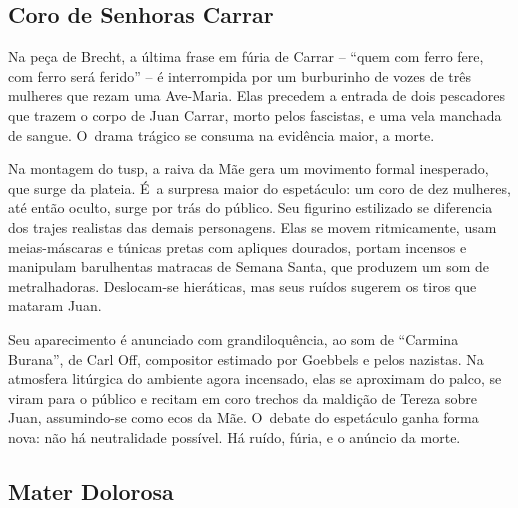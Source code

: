\subsection{Coro de Senhoras Carrar}

Na peça de Brecht, a última frase em fúria de Carrar -- “quem com ferro
fere, com ferro será ferido” -- é interrompida por um burburinho de vozes
de três mulheres que rezam uma Ave-Maria. Elas precedem a entrada de
dois pescadores que trazem o corpo de Juan Carrar, morto pelos
fascistas, e uma vela manchada de sangue. O~drama trágico se consuma na
evidência maior, a morte.

Na montagem do {\sc tusp}, a raiva da Mãe gera um movimento formal inesperado,
que surge da plateia. É~a surpresa maior do espetáculo: um coro de dez
mulheres, até então oculto, surge por trás do público. Seu figurino
estilizado se diferencia dos trajes realistas das demais personagens.
Elas se movem ritmicamente, usam meias-máscaras e túnicas pretas com
apliques dourados, portam incensos e manipulam barulhentas matracas de
Semana Santa, que produzem um som de metralhadoras. Deslocam-se
hieráticas, mas seus ruídos sugerem os tiros que mataram Juan.

Seu aparecimento é anunciado com grandiloquência, ao som de “Carmina
Burana”, de Carl Off, compositor estimado por Goebbels e pelos nazistas.
Na atmosfera litúrgica do ambiente agora incensado, elas se aproximam do
palco, se viram para o público e recitam em coro trechos da maldição de
Tereza sobre Juan, assumindo-se como ecos da Mãe. O~debate do espetáculo
ganha forma nova: não há neutralidade possível. Há ruído, fúria, e o
anúncio da morte.


\subsection{Mater Dolorosa}

